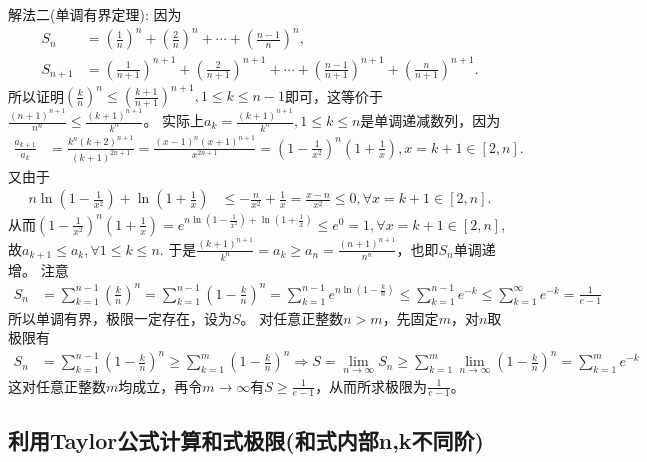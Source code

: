 \documentclass[../../main.tex]{subfiles}
\begin{document}
\begin{solution}
{\color{blue}解法二(单调有界定理):}
因为
\begin{align*}
S_n&=\left(\frac{1}{n}\right)^n+\left(\frac{2}{n}\right)^n+\cdots+\left(\frac{n - 1}{n}\right)^n,\\
S_{n + 1}&=\left(\frac{1}{n + 1}\right)^{n + 1}+\left(\frac{2}{n + 1}\right)^{n + 1}+\cdots+\left(\frac{n - 1}{n + 1}\right)^{n + 1}+\left(\frac{n}{n + 1}\right)^{n + 1}.
\end{align*}
所以证明\(\left(\frac{k}{n}\right)^n\leq\left(\frac{k + 1}{n + 1}\right)^{n + 1},1\leq k\leq n - 1\)即可，这等价于\(\frac{(n + 1)^{n + 1}}{n^n}\leq\frac{(k + 1)^{n + 1}}{k^n}\)。
实际上\(a_k = \frac{(k + 1)^{n + 1}}{k^n},1\leq k\leq n\)是单调递减数列，因为
\begin{align*}
\frac{a_{k + 1}}{a_k}&=\frac{k^n(k + 2)^{n + 1}}{(k + 1)^{2n + 1}}=\frac{(x - 1)^n(x + 1)^{n + 1}}{x^{2n + 1}}=\left(1-\frac{1}{x^2}\right)^n\left(1+\frac{1}{x}\right),x = k + 1\in[2,n].
\end{align*}
又由于
\begin{align*}
n\ln\left(1-\frac{1}{x^2}\right)+\ln\left(1+\frac{1}{x}\right)&\leq-\frac{n}{x^2}+\frac{1}{x}=\frac{x - n}{x^2}\leq0,\forall x = k + 1\in[2,n].
\end{align*}
从而$\left( 1-\frac{1}{x^2} \right) ^n\left( 1+\frac{1}{x} \right) =e^{n\ln \left( 1-\frac{1}{x^2} \right) +\ln \left( 1+\frac{1}{x} \right)}\leqslant e^0=1,\forall x = k + 1\in[2,n]$,故$a_{k + 1}\leq a_k,\forall 1\leq k\leq n$.
于是\(\frac{(k + 1)^{n + 1}}{k^n}=a_k\geq a_n=\frac{(n + 1)^{n + 1}}{n^n}\)，也即\(S_n\)单调递增。
注意
\begin{align*}
S_n&=\sum_{k = 1}^{n - 1}\left(\frac{k}{n}\right)^n=\sum_{k = 1}^{n - 1}\left(1-\frac{k}{n}\right)^n=\sum_{k = 1}^{n - 1}e^{n\ln\left(1-\frac{k}{n}\right)}\leq\sum_{k = 1}^{n - 1}e^{-k}\leq\sum_{k = 1}^{\infty}e^{-k}=\frac{1}{e - 1}
\end{align*}
所以单调有界，极限一定存在，设为\(S\)。
对任意正整数\(n>m\)，先固定\(m\)，对\(n\)取极限有
\begin{align*}
S_n&=\sum_{k = 1}^{n - 1}\left(1-\frac{k}{n}\right)^n\geq\sum_{k = 1}^{m}\left(1-\frac{k}{n}\right)^n\Rightarrow S=\lim_{n\rightarrow\infty}S_n\geq\sum_{k = 1}^{m}\lim_{n\rightarrow\infty}\left(1-\frac{k}{n}\right)^n=\sum_{k = 1}^{m}e^{-k}
\end{align*}
这对任意正整数\(m\)均成立，再令\(m\rightarrow\infty\)有\(S\geq\frac{1}{e - 1}\)，从而所求极限为\(\frac{1}{e - 1}\)。
\end{solution}


\subsection{利用Taylor公式计算和式极限(和式内部n,k不同阶)}
\end{document}

